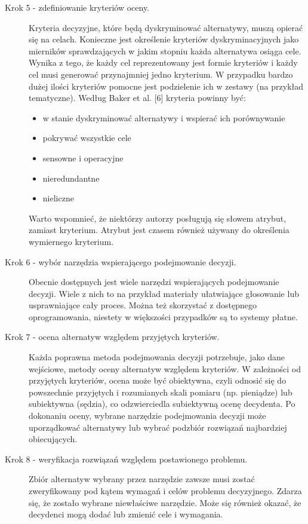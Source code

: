 \begin{description}
  \item[Krok 5 - zdefiniowanie kryteriów oceny.] Kryteria decyzyjne, które będą
  dyskryminować alternatywy, muszą opierać się na celach. Konieczne jest 
  określenie kryteriów dyskryminacyjnych jako mierników sprawdzających w jakim 
  stopniu każda alternatywa osiąga cele. Wynika z tego, że każdy cel 
  reprezentowany jest formie kryteriów i każdy cel musi generować przynajmniej 
  jedno kryterium. W przypadku bardzo dużej ilości kryteriów pomocne jest 
  podzielenie ich w zestawy (na przykład tematyczne). Według Baker et al.
  [6] kryteria powinny być:
  
  \begin{itemize}
    \item w stanie dyskryminować alternatywy i wspierać ich porównywanie
	\item pokrywać wszystkie cele
	\item sensowne i operacyjne
	\item nieredundantne
	\item nieliczne
  \end{itemize}
  
  Warto wspomnieć, że niektórzy autorzy posługują się słowem atrybut, zamiast 
  kryterium. Atrybut jest czasem również używany do określenia wymiernego
  kryterium.
  
  \item[Krok 6 - wybór narzędzia wspierającego podejmowanie decyzji.] Obecnie
  dostępnych jest wiele narzędzi wspierających podejmowanie decyzji. Wiele z
  nich to na przykład materiały ułatwiające głosowanie lub usprawniające cały
  proces. Można też skorzystać z dostępnego oprogramowania, niestety w
  większości przypadków są to systemy płatne.
  \item[Krok 7 - ocena alternatyw względem przyjętych kryteriów.] Każda poprawna
  metoda podejmowania decyzji potrzebuje, jako dane wejściowe, metody oceny
  alternatyw względem kryteriów. W zależności od przyjętych kryteriów, ocena
  może być obiektywna, czyli odnosić się do powszechnie przyjętych i rozumianych
  skali pomiaru (np. pieniądze) lub subiektywna (sędzia), co odzwierciedla
  subiektywną ocenę decydenta. Po dokonaniu oceny, wybrane narzędzie
  podejmowania decyzji może uporządkować alternatywy lub wybrać podzbiór
  rozwiązań najbardziej obiecujących.
  \item[Krok 8 - weryfikacja rozwiązań względem postawionego problemu.] Zbiór
  alternatyw wybrany przez narzędzie zawsze musi zostać zweryfikowany pod kątem
  wymagań i celów problemu decyzyjnego. Zdarza się, że zostało wybrane
  niewłaściwe narzędzie. Może się również okazać, że decydenci mogą dodać lub
  zmienić cele i wymagania.

\end{description}





